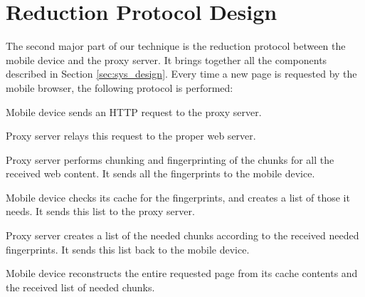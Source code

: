 \section{Reduction Protocol Design}
\label{sec:protocol}
The second major part of our technique is the reduction protocol between the mobile device and the proxy server. It brings together all the components described in Section \ref{sec:sys_design}. Every time a new page is requested by the mobile browser, the following protocol is performed:
\begin{enum}
\item Mobile device sends an HTTP request to the proxy server.
\item Proxy server relays this request to the proper web server.
\item Proxy server performs chunking and fingerprinting of the chunks for all the received web content. It sends all the fingerprints to the mobile device.
\item Mobile device checks its cache for the fingerprints, and creates a list of those it needs. It sends this list to the proxy server.
\item Proxy server creates a list of the needed chunks according to the received needed fingerprints. It sends this list back to the mobile device.
\item Mobile device reconstructs the entire requested page from its cache contents and the received list of needed chunks.
\end{enum}




